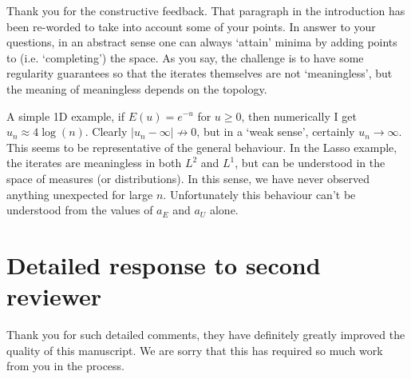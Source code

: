 \documentclass[12pt]{article}
\begin{document}
Thank you for the constructive feedback. That paragraph in the introduction has been re-worded to take into account some of your points. In answer to your questions, in an abstract sense one can always `attain' minima by adding points to (i.e. `completing') the space. As you say, the challenge is to have some regularity guarantees so that the iterates themselves are not `meaningless', but the meaning of meaningless depends on the topology. 

A simple 1D example, if $E(u) = e^{-u}$ for $u\geq0$, then numerically I get $u_n\approx 4\log(n)$. Clearly $|u_n-\infty|\not\to0$, but in a `weak sense', certainly $u_n\to\infty$. This seems to be representative of the general behaviour. In the Lasso example, the iterates are meaningless in both $L^2$ and $L^1$, but can be understood in the space of measures (or distributions). In this sense, we have never observed anything unexpected for large $n$. Unfortunately this behaviour can't be understood from the values of $a_E$ and $a_U$ alone.

\section{Detailed response to second reviewer}
Thank you for such detailed comments, they have definitely greatly improved the quality of this manuscript. We are sorry that this has required so much work from you in the process.
\end{document}
